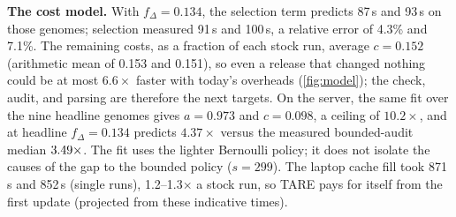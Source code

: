 \documentclass[letterpaper,twocolumn,10pt]{article}
\theoremstyle{definition}
\newcommand{\sys}{TARE\xspace}
\newcommand{\sys}{PARE\xspace}
\begin{document}
\textbf{The cost model.} With $f_\Delta = 0.134$, the selection term predicts 87\,s and 93\,s on those genomes; selection measured 91\,s and 100\,s, a
relative error of 4.3\% and 7.1\%. The remaining costs, as a fraction of each stock run, average $c = 0.152$ (arithmetic mean of 0.153 and 0.151), so even a release that changed
nothing could be at most $6.6\times$ faster with today's overheads (\cref{fig:model}); the check, audit, and parsing are
therefore the next targets. On the server, the same fit over the nine headline genomes gives $a = 0.973$ and
$c = 0.098$, a ceiling of $10.2\times$, and at headline $f_\Delta{=}0.134$ predicts $4.37\times$ versus the measured
bounded\nobreakdash-audit median $3.49\times$. The fit uses the lighter Bernoulli policy; it does not
isolate the causes of the gap to the bounded policy ($s{=}299$).
The laptop cache fill took 871\,s and 852\,s (single runs),
1.2--1.3$\times$ a stock run, so \sys pays for itself from the first update (projected from these indicative times).
\end{document}
